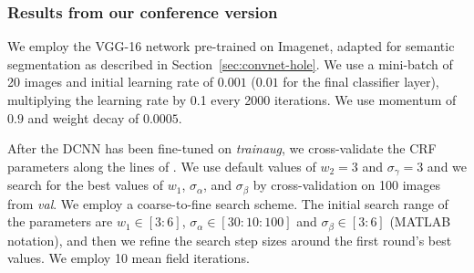 \subsubsection{Results from our conference version}

We employ the VGG-16 network pre-trained on Imagenet, adapted for semantic
segmentation as described in Section~\ref{sec:convnet-hole}. We use a
mini-batch of 20 images and initial learning rate of $0.001$ ($0.01$
for the final classifier layer), multiplying the learning rate by 0.1 every
2000 iterations. We use momentum of $0.9$ and weight decay of $0.0005$.

After the DCNN has been fine-tuned on \textit{trainaug}, we cross-validate the
CRF parameters along the lines of \cite{krahenbuhl2011efficient}. We use default
values of $w_2 = 3$ and $\sigma_\gamma = 3$ and we search for the best values of
$w_1$, $\sigma_\alpha$, and $\sigma_\beta$ by cross-validation on 100 images
from \textit{val}. We employ a coarse-to-fine search scheme. The initial search
range of the parameters are $w_1 \in [3:6]$, $\sigma_\alpha \in [30:10:100]$ and
$\sigma_\beta \in [3:6]$ (MATLAB notation), and then we refine the search step
sizes around the first round's best values. We employ 10 mean field iterations.

\begin{table}[!t]
  \centering
  \addtolength{\tabcolsep}{2.5pt}
  \caption{Effect of Field-Of-View by adjusting the kernel size and atrous
    sampling rate $r$ at `fc6' layer. We show number of model parameters,
    training speed (img/sec), and \textit{val} set mean IOU before and after
    CRF. DeepLab-LargeFOV (kernel size , $r = 12$) strikes the best
    balance.}
  \label{tab:fov}
\end{table}

